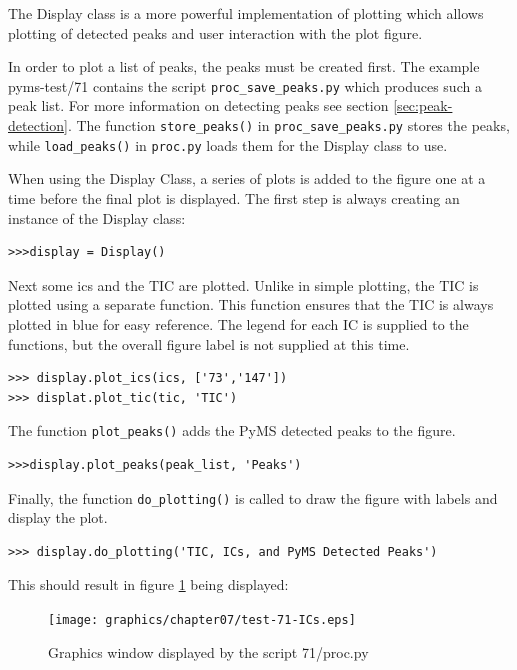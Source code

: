 
The Display class is a more powerful implementation of plotting which 
allows plotting of detected peaks and user interaction with the plot
figure.

In order to plot a list of peaks, the peaks must be created first.
The example pyms-test/71 contains the script {\tt proc\_save\_peaks.py}
which produces such a peak list. For more information on detecting peaks
see section \ref{sec:peak-detection}. The function {\tt store\_peaks()}
in {\tt proc\_save\_peaks.py} stores the peaks, while {\tt load\_peaks()}
in {\tt proc.py} loads them for the Display class to use.

When using the Display Class, a series of plots is added to the figure
one at a time before the final plot is displayed. The first step is
always creating an instance of the Display class:

\begin{verbatim}
>>>display = Display()
\end{verbatim}

Next some ics and the TIC are plotted. Unlike in simple plotting, the
TIC is plotted using a separate function. This function ensures that
the TIC is always plotted in blue for easy reference. The legend for
each IC is supplied to the functions, but the overall figure label
is not supplied at this time.

\begin{verbatim}
>>> display.plot_ics(ics, ['73','147'])
>>> displat.plot_tic(tic, 'TIC')
\end{verbatim}

The function {\tt plot\_peaks()} adds the PyMS detected peaks to the
figure.

\begin{verbatim}
>>>display.plot_peaks(peak_list, 'Peaks')
\end{verbatim}

Finally, the function {\tt do\_plotting()} is called to draw the figure with 
labels and display the plot.

\begin{verbatim}
>>> display.do_plotting('TIC, ICs, and PyMS Detected Peaks')
\end{verbatim}

This should result in figure \ref{fig:71-ics} being displayed:

\begin{figure}
  \begin{center}
    \texttt{[image: graphics/chapter07/test-71-ICs.eps]}
  \end{center}
  \caption{Graphics window displayed by the script 71/proc.py}
  \label{fig:71-ics}
\end{figure}

